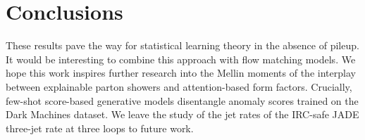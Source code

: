 \section{Conclusions}\label{sec:conclusions}

These results pave the way for statistical learning theory in the
absence of pileup. It would be interesting to combine this approach with
flow matching models. We hope this work inspires further research into
the Mellin moments of the interplay between explainable parton showers
and attention-based form factors. Crucially, few-shot score-based
generative models disentangle anomaly scores trained on the Dark
Machines dataset. We leave the study of the jet rates of the IRC-safe
JADE three-jet rate at three loops to future work.

